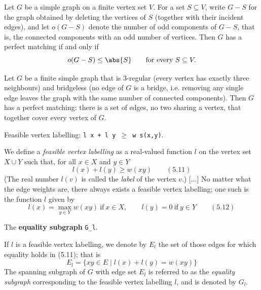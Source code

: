 \begin{theorem}
\label{SimpleGraph.tutte_perfect_matching}
Let $G$ be a simple graph on a finite vertex set $V$. For a set $S \subseteq V$, write
$G - S$ for the graph obtained by deleting the vertices of $S$ (together with their
incident edges), and let $o(G - S)$ denote the number of odd components of $G - S$, that
is, the connected components with an odd number of vertices. Then $G$ has a perfect
matching if and only if
\[o(G - S) \le \abs{S} \qquad \text{for every } S \subseteq V.\]
\end{theorem}

\begin{theorem}
\label{SimpleGraph.petersen_three_regular_bridgeless}
Let $G$ be a finite simple graph that is $3$-regular (every vertex has exactly three
neighbours) and bridgeless (no edge of $G$ is a bridge, i.e. removing any single edge
leaves the graph with the same number of connected components). Then $G$ has a perfect
matching: there is a set of edges, no two sharing a vertex, that together cover every
vertex of $G$.
\end{theorem}

\begin{definition}
\label{SimpleGraph.IsFeasibleLabelling}
\leanok
Feasible vertex labelling: \texttt{l x + l y $\ge$ w s(x,y)}.

We define a \emph{feasible vertex labelling} as a real-valued function $l$ on the
vertex set $X \cup Y$ such that, for all $x \in X$ and $y \in Y$
\[l(x) + l(y) \geq w(xy) \qquad (5.11)\]
(The real number $l(v)$ is called the \emph{label} of the vertex $v$.) [...] No
matter what the edge weights are, there always exists a feasible vertex
labelling; one such is the function $l$ given by
\[l(x) = \max_{y \in Y} w(xy) \ \text{if} \ x \in X, \qquad l(y) = 0 \ \text{if} \ y \in Y \qquad (5.12)\]
\end{definition}

\begin{definition}
\label{SimpleGraph.equalitySubgraph}
The \textbf{equality subgraph} \texttt{G\_l}.

If $l$ is a feasible vertex labelling, we denote by $E_l$ the set of those edges
for which equality holds in (5.11); that is
\[E_l = \{xy \in E \mid l(x) + l(y) = w(xy)\}\]
The spanning subgraph of $G$ with edge set $E_l$ is referred to as the \emph{equality
subgraph} corresponding to the feasible vertex labelling $l$, and is denoted by
$G_l$.
\end{definition}

